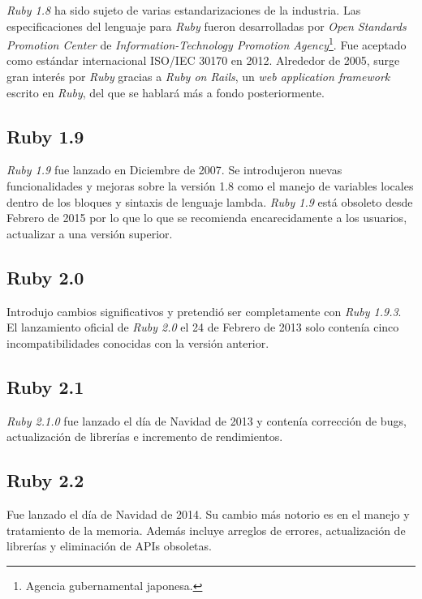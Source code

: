 \textit{Ruby 1.8} ha sido sujeto de varias estandarizaciones de la industria. Las especificaciones del lenguaje para \textit{Ruby} fueron desarrolladas por \textit{Open Standards Promotion Center} de \textit{Information-Technology Promotion Agency}\footnote{Agencia gubernamental japonesa.}. Fue aceptado como estándar internacional ISO/IEC 30170 en 2012.
Alrededor de 2005, surge gran interés por \textit{Ruby} gracias a \textit{Ruby on Rails}, un \textit{web application framework} escrito en \textit{Ruby}, del que se hablará más a fondo posteriormente.

\subsection{Ruby 1.9}
\textit{Ruby 1.9} fue lanzado en Diciembre de 2007. Se introdujeron nuevas funcionalidades y mejoras sobre la versión 1.8 como el manejo de variables locales dentro de los bloques y sintaxis de lenguaje lambda. \textit{Ruby 1.9} está obsoleto desde Febrero de 2015 por lo que lo que se recomienda encarecidamente a los usuarios, actualizar a una versión superior.

\subsection{Ruby 2.0}
Introdujo cambios significativos y pretendió ser completamente con \textit{Ruby 1.9.3}. El lanzamiento oficial de \textit{Ruby 2.0} el 24 de Febrero de 2013 solo contenía cinco incompatibilidades conocidas con la versión anterior.

\subsection{Ruby 2.1}
\textit{Ruby 2.1.0} fue lanzado el día de Navidad de 2013 y contenía corrección de bugs, actualización de librerías e incremento de rendimientos.

\subsection{Ruby 2.2}
Fue lanzado el día de Navidad de 2014. Su cambio más notorio es en el manejo y tratamiento de la memoria. Además incluye arreglos de errores, actualización de librerías y eliminación de APIs obsoletas.

